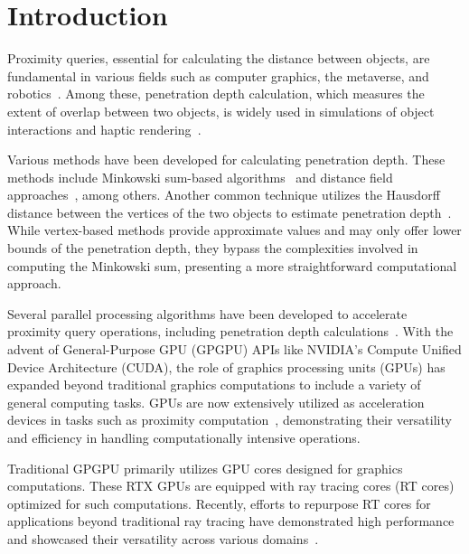 \section{Introduction}

Proximity queries, essential for calculating the distance between objects, are fundamental in various fields such as computer graphics, the metaverse, and robotics~\cite{lin2017collision}.
Among these, penetration depth calculation, which measures the extent of overlap between two objects, is widely used in simulations of object interactions and haptic rendering~\cite{zhang2006generalized, laycock2007survey}.

Various methods have been developed for calculating penetration depth.
These methods include Minkowski sum-based algorithms~\cite{dobkin1993computing,je2012polydepth,lee2017penetration} and distance field approaches~\cite{fisher2001fast,sud2006fast}, among others.
Another common technique utilizes the Hausdorff distance between the vertices of the two objects to estimate penetration depth~\cite{SIG09HIST}.
While vertex-based methods provide approximate values and may only offer lower bounds of the penetration depth, they bypass the complexities involved in computing the Minkowski sum, presenting a more straightforward computational approach.

Several parallel processing algorithms have been developed to accelerate proximity query operations, including penetration depth calculations~\cite{kim2002fast,lien2008covering}.
With the advent of General-Purpose GPU (GPGPU) APIs like NVIDIA's Compute Unified Device Architecture (CUDA), the role of graphics processing units (GPUs) has expanded beyond traditional graphics computations to include a variety of general computing tasks.
GPUs are now extensively utilized as acceleration devices in tasks such as proximity computation~\cite{kim2009hpccd,lauterbach2010gproximity,li2011voxelized,kim2013scheduling}, demonstrating their versatility and efficiency in handling computationally intensive operations.

Traditional GPGPU primarily utilizes GPU cores designed for graphics computations.
These RTX GPUs are equipped with ray tracing cores (RT cores) optimized for such computations.
Recently, efforts to repurpose RT cores for applications beyond traditional ray tracing have demonstrated high performance and showcased their versatility across various domains~\cite{wald2019rtx,thoman2022multi,zhu2022rtnn,nagarajan2023rt}.

